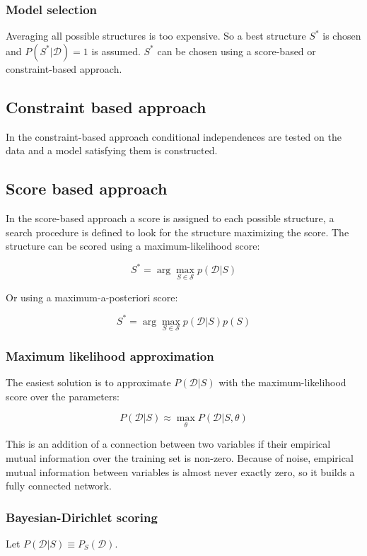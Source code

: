 		\subsubsection{Model selection}
		Averaging all possible structures is too expensive.
		So a best structure $S^*$ is chosen and $P(S^*|\mathcal{D})=1$ is assumed.
		$S^*$ can be chosen using a score-based or constraint-based approach.

	\subsection{Constraint based approach}
	In the constraint-based approach conditional independences are tested on the data and a model satisfying them is constructed.

	\subsection{Score based approach}
	In the score-based approach a score is assigned to each possible structure, a search procedure is defined to look for the structure maximizing the score.
	The structure can be scored using a maximum-likelihood score:

	$$S^*=\arg\max\limits_{S\in\mathcal{S}}p(\mathcal{D}|S)$$

	Or using a maximum-a-posteriori score:

	$$S^*=\arg\max\limits_{S\in\mathcal{S}}p(\mathcal{D}|S)p(S)$$

		\subsubsection{Maximum likelihood approximation}
		The easiest solution is to approximate $P(\mathcal{D}|S)$ with the maximum-likelihood score over the parameters:

		$$P(\mathcal{D}|S)\approx\max\limits_{\theta}P(\mathcal{D}|S,\theta)$$

		This is an addition of a connection between two variables if their empirical mutual information over the training set is non-zero.
		Because of noise, empirical mutual information between variables is almost never exactly zero, so it builds a fully connected network.

		\subsubsection{Bayesian-Dirichlet scoring}
		Let $P(\mathcal{D}|S)\equiv P_S(\mathcal{D})$.

